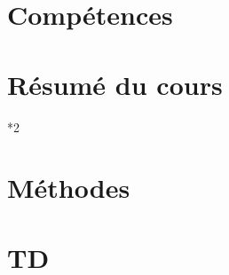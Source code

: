 \documentclass{poly}
\begin{document}
\maketitle{}

\part{Compétences}


\clearpage \part{Résumé du cours}
\begin{paracol}[1]*{2}
    \begin{leftcolumn}
    
    \end{leftcolumn}
    \begin{rightcolumn}
    \end{rightcolumn}
\end{paracol}

\clearpage {} \part{Méthodes}


\clearpage \part{TD}

\end{document}

